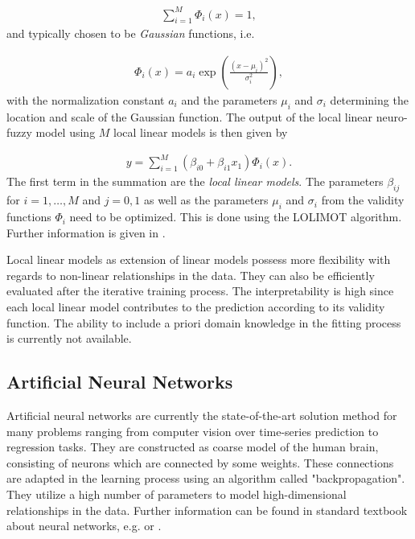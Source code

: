 \begin{align} \label{eq:LILOMOT-normalized-basis-fucntions}
	\sum_{i=1}^M \Phi_i(x) = 1,
\end{align}
%
and typically chosen to be \emph{Gaussian} functions, i.e. 

\begin{align} \label{eq:validity-function}
	\Phi_i(x) = a_i \exp \left(\frac{(x - \mu_i)^2}{\sigma_i^2} \right),	
\end{align}
%
with the normalization constant $a_i$ and the parameters $\mu_i$ and $\sigma_i$ determining the location and scale of the Gaussian function. The output of the local linear neuro-fuzzy model using $M$ local linear models is then given by

\begin{align} \label{eq:LOLIMOT}
	y = \sum_{i=1}^M \left(\beta_{i0} + \beta_{i1} x_1\right) \Phi_i(x).
\end{align}
%
The first term in the summation are the \emph{local linear models}. The parameters $\beta_{ij}$ for $i=1, \dots, M$ and $j=0, 1$ as well as the parameters $\mu_i$ and $\sigma_i$ from the validity functions $\Phi_i$ need to be optimized. This is done using the LOLIMOT algorithm. Further information is given in \cite{nelles2013nonlinear}. 

Local linear models as extension of linear models possess more flexibility with regards to non-linear relationships in the data. They can also be efficiently evaluated after the iterative training process. The interpretability is high since each local linear model contributes to the prediction according to its validity function. The ability to include a priori domain knowledge in the fitting process is currently not available.   

\subsection{Artificial Neural Networks}

Artificial neural networks are currently the state-of-the-art solution method for many problems ranging from computer vision over time-series prediction to regression tasks. They are constructed as coarse model of the human brain, consisting of neurons which are connected by some weights. These connections are adapted in the learning process using an algorithm called "backpropagation". They utilize a high number of parameters to model high-dimensional relationships in the data. Further information can be found in standard textbook about neural networks, e.g. \cite{bishop2006patternRecognition} or \cite{goodfellow2016deep}. 


